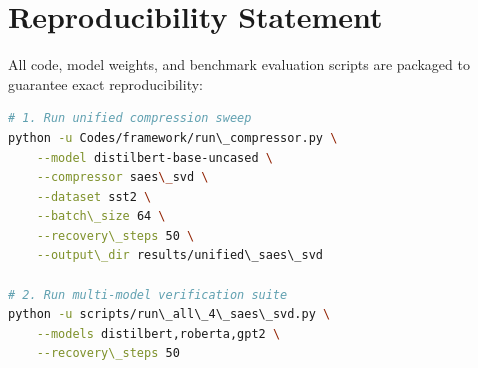 \section{Reproducibility Statement}
All code, model weights, and benchmark evaluation scripts are packaged to guarantee exact reproducibility:
\begin{lstlisting}[language=bash]
# 1. Run unified compression sweep
python -u Codes/framework/run\_compressor.py \
    --model distilbert-base-uncased \
    --compressor saes\_svd \
    --dataset sst2 \
    --batch\_size 64 \
    --recovery\_steps 50 \
    --output\_dir results/unified\_saes\_svd

# 2. Run multi-model verification suite
python -u scripts/run\_all\_4\_saes\_svd.py \
    --models distilbert,roberta,gpt2 \
    --recovery\_steps 50
\end{lstlisting}
